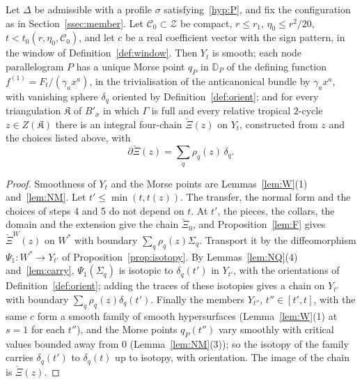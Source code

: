 \begin{proposition}\label{prop:Bprecise}
Let $\Delta$ be admissible with a profile $\sigma$ satisfying~\ref{hyp:P}, and fix the configuration as in
Section~\ref{ssec:member}. Let $\mathscr C_0\subset\mathcal Z$ be compact, $r\le r_1$, $\eta_0\le r^2/20$,
$t<t_0(r,\eta_0,\mathscr C_0)$, and let $c$ be a real coefficient vector with the sign pattern, in the window of
Definition~\ref{def:window}. Then $Y_t$ is smooth; each node
parallelogram $P$ has a unique Morse point $q_P$ in $\mathbb D_P$ of the defining function $f^{(1)}=F_t/(\gamma_ax^a)$, in the
trivialisation of the anticanonical bundle by $\gamma_ax^a$, with vanishing sphere $\delta_q$
oriented by Definition~\ref{def:orient}; and for every triangulation $\mathfrak K$ of $B'_\sigma$ in which $\Gamma$ is full
and every relative tropical $2$-cycle $z\in Z(\mathfrak K)$ there is an integral four-chain $\check\Xi(z)$ on $Y_t$,
constructed from $z$ and the choices listed above, with
\[
\partial\check\Xi(z)=\sum_q\rho_q(z)\,\delta_q .
\]
\end{proposition}

\begin{proof}
Smoothness of $Y_t$ and the Morse points are Lemmas~\ref{lem:W}(1) and~\ref{lem:NM}. Let $t'\le\min(t,t(z))$. The transfer,
the normal form and the choices of steps 4 and 5 do not depend on $t$. At $t'$, the pieces, the collars, the domain
and the extension give the chain $\check\Xi_0$, and Proposition~\ref{lem:F} gives $\check\Xi^W(z)$ on $W^*$ with boundary
$\sum_q\rho_q(z)\Sigma_q$. Transport it by the diffeomorphism $\Psi_1\colon W^*\to Y_{t'}$ of
Proposition~\ref{prop:isotopy}. By Lemmas~\ref{lem:NQ}(4) and~\ref{lem:carry}, $\Psi_1(\Sigma_q)$ is isotopic to
$\delta_q(t')$ in $Y_{t'}$, with the orientations of Definition~\ref{def:orient}; adding the traces of these isotopies gives
a chain on $Y_{t'}$ with boundary $\sum_q\rho_q(z)\delta_q(t')$. Finally the members $Y_{t''}$, $t''\in[t',t]$, with the same
$c$ form a smooth family of smooth hypersurfaces (Lemma~\ref{lem:W}(1) at $s=1$ for each $t''$), and the Morse points
$q_P(t'')$ vary smoothly with critical values bounded away from $0$ (Lemma~\ref{lem:NM}(3)); so the isotopy of the family
carries $\delta_q(t')$ to $\delta_q(t)$ up to isotopy, with orientation. The image of the chain is $\check\Xi(z)$.
\end{proof}


